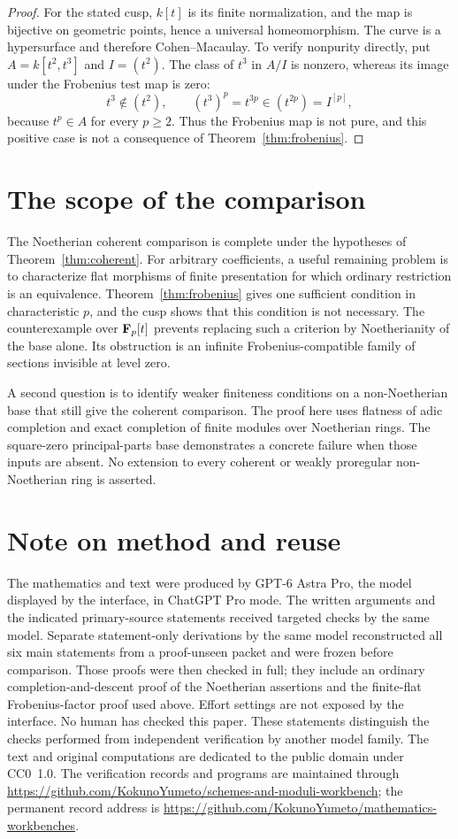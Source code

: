 \documentclass[11pt]{article}
\newcommand{\workbenchurl}{https://github.com/KokunoYumeto/schemes-and-moduli-workbench}
\newcommand{\recordurl}{https://github.com/KokunoYumeto/mathematics-workbenches}
\theoremstyle{definition}\newtheorem{definition}[theorem]{Definition}
\theoremstyle{remark}\newtheorem{remark}[theorem]{Remark}
\begin{document}
\begin{proof}
For the stated cusp, $k[t]$ is its finite normalization, and the map is bijective on geometric points, hence a universal homeomorphism.  The curve is a hypersurface and therefore Cohen--Macaulay.  To verify nonpurity directly, put $A=k[t^2,t^3]$ and $I=(t^2)$.  The class of $t^3$ in $A/I$ is nonzero, whereas its image under the Frobenius test map is zero:
\[
       t^3\notin(t^2),\qquad
       (t^3)^p=t^{3p}\in(t^{2p})=I^{[p]},
\]
because $t^p\in A$ for every $p\geq2$.  Thus the Frobenius map is not pure, and this positive case is not a consequence of Theorem~\ref{thm:frobenius}.
\end{proof}

\section{The scope of the comparison}

The Noetherian coherent comparison is complete under the hypotheses of Theorem~\ref{thm:coherent}. For arbitrary coefficients, a useful remaining problem is to characterize flat morphisms of finite presentation for which ordinary restriction is an equivalence. Theorem~\ref{thm:frobenius} gives one sufficient condition in characteristic $p$, and the cusp shows that this condition is not necessary. The counterexample over $\mathbf F_p[t]$ prevents replacing such a criterion by Noetherianity of the base alone. Its obstruction is an infinite Frobenius-compatible family of sections invisible at level zero.

A second question is to identify weaker finiteness conditions on a non-Noetherian base that still give the coherent comparison. The proof here uses flatness of adic completion and exact completion of finite modules over Noetherian rings. The square-zero principal-parts base demonstrates a concrete failure when those inputs are absent. No extension to every coherent or weakly proregular non-Noetherian ring is asserted.

\section*{Note on method and reuse}

The mathematics and text were produced by GPT-6 Astra Pro, the model displayed by the interface, in ChatGPT Pro mode. The written arguments and the indicated primary-source statements received targeted checks by the same model. Separate statement-only derivations by the same model reconstructed all six main statements from a proof-unseen packet and were frozen before comparison. Those proofs were then checked in full; they include an ordinary completion-and-descent proof of the Noetherian assertions and the finite-flat Frobenius-factor proof used above. Effort settings are not exposed by the interface. No human has checked this paper. These statements distinguish the checks performed from independent verification by another model family. The text and original computations are dedicated to the public domain under CC0~1.0. The verification records and programs are maintained through \url{\workbenchurl}; the permanent record address is \url{\recordurl}.
\end{document}
